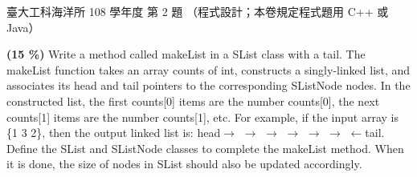 \begin{pastexam}[label={px:ntu-108-esoe-ds-02}]{臺大工科海洋所 108 學年度 第 2 題}
（程式設計；本卷規定程式題用 C++ 或 Java）

\textbf{(15 \%)} Write a method called \textsf{makeList} in a \textsf{SList} class with a tail. The
\textsf{makeList} function takes an array counts of \textsf{int}, constructs a singly-linked list,
and associates its head and tail pointers to the corresponding \textsf{SListNode} nodes. In the
constructed list, the first \textsf{counts[0]} items are the number \textsf{counts[0]}, the next
\textsf{counts[1]} items are the number \textsf{counts[1]}, etc. For example, if the input array is
\{1 3 2\}, then the output linked list is: \textsf{head}$\rightarrow$  $\rightarrow$ 
$\rightarrow$  $\rightarrow$  $\rightarrow$  $\rightarrow$ 
$\leftarrow$\textsf{tail}. Define the \textsf{SList} and \textsf{SListNode} classes to complete the
\textsf{makeList} method. When it is done, the \textsf{size} of nodes in \textsf{SList} should also
be updated accordingly.
\end{pastexam}

